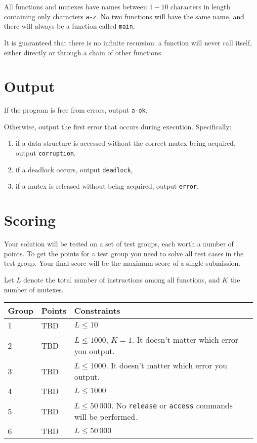 All functions and mutexes have names between $1-10$ characters in length containing only characters \texttt{a-z}.
No two functions will have the same name, and there will always be a function called \texttt{main}.

It is guaranteed that there is no infinite recursion: a function will never call itself, either directly or through a chain of other functions.

\section*{Output}
If the program is free from errors, output \texttt{a-ok}.

Otherwise, output the first error that occurs during execution. Specifically:
\begin{enumerate}
  \item if a data structure is accessed without the correct mutex being acquired, output \texttt{corruption},
  \item if a deadlock occurs, output \texttt{deadlock},
  \item if a mutex is released without being acquired, output \texttt{error}.
\end{enumerate}

\section*{Scoring}
Your solution will be tested on a set of test groups, each worth a number of points.
To get the points for a test group you need to solve all test cases in the test group.
Your final score will be the maximum score of a single submission.

Let $L$ denote the total number of instructions among all functions, and $K$ the number of mutexes.

\noindent
\begin{tabular}{| l | l | l | l |}
\hline
Group & Points & Constraints \\ \hline
1     & TBD    & $L \le 10$ \\ \hline
2     & TBD    & $L \le 1000$, $K = 1$. It doesn't matter which error you output. \\ \hline
3     & TBD    & $L \le 1000$. It doesn't matter which error you output. \\ \hline
4     & TBD    & $L \le 1000$ \\ \hline
5     & TBD    & $L \le 50\,000$. No \texttt{release} or \texttt{access} commands will be performed. \\ \hline
6     & TBD    & $L \le 50\,000$ \\ \hline
\end{tabular}

